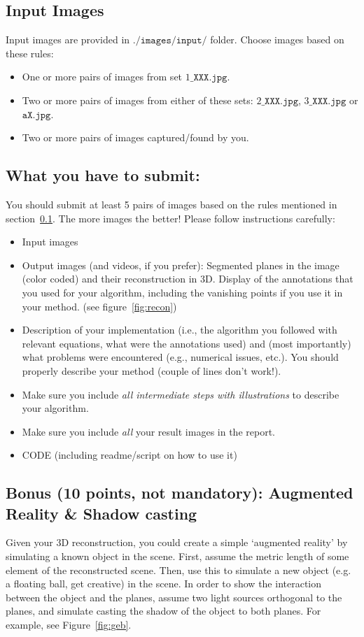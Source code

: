 \documentclass[11pt]{article}
\begin{document}
\subsection{Input Images}
\label{inp1}
Input images are provided in $\texttt{./images/input/}$ folder. Choose images based on these rules:
\begin{itemize}
\item One or more pairs of images from set $1\_\texttt{XXX.jpg}$.
\item Two or more pairs of images from either of these sets: $2\_\texttt{XXX.jpg}$, $3\_\texttt{XXX.jpg}$ or $\texttt{aX.jpg}$.
\item Two or more pairs of images captured/found by you.
\end{itemize}

\subsection{What you have to submit:}
\label{sec:tosubmit}
You should submit at least 5 pairs of images based on the rules mentioned in section~\ref{inp1}. The more images the better! Please follow instructions carefully:
\begin{itemize}
\item Input images
\item Output images (and videos, if you prefer): Segmented planes in the image (color coded) and their reconstruction in 3D. Display of the annotations that you used for your algorithm, including the vanishing points if you use it in your method. (see figure~\ref{fig:recon})
\item Description of your implementation (i.e., the algorithm you followed with relevant equations,
what were the annotations used) and (most importantly) what problems were encountered (e.g., numerical issues, etc.). You should properly describe your method (couple of lines don't work!).
\item Make sure you include {\it all intermediate steps with illustrations} to describe your algorithm.
\item Make sure you include {\it all} your result images in the report.
\item CODE (including readme/script on how to use it)
\end{itemize}

\subsection{Bonus (10 points, not mandatory): Augmented Reality \& Shadow casting}
Given your 3D reconstruction, you could create a simple `augmented reality' by simulating a known object in the scene. First, assume the metric length of some element of the reconstructed scene. Then, use this to simulate a new object (e.g. a floating ball, get creative) in the scene. In order to show the interaction between the object and the planes, assume two light sources orthogonal to the planes, and simulate casting the shadow of the object to both planes. For example, see Figure~\ref{fig:geb}.
\end{document}
